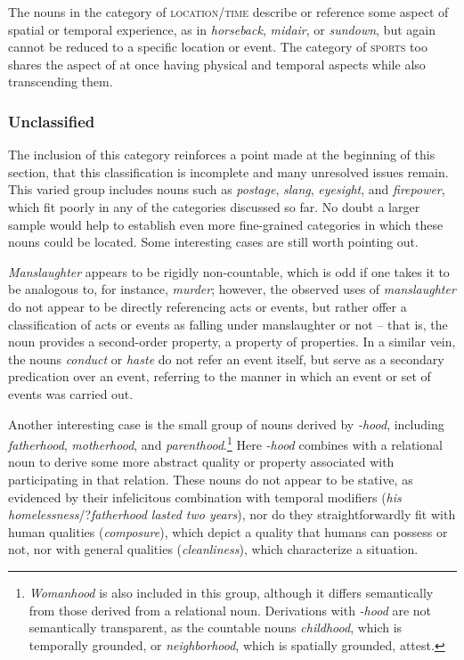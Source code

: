 \documentclass[output=paper]{langscibook}
\begin{document}
The nouns in the category of \textsc{location/time} describe or reference some aspect of spatial or temporal experience, as in \textit{horseback},  \textit{midair}, or \textit{sundown}, but again cannot be reduced to a specific location or event.  The category of \textsc{sports} too shares the aspect of at once having physical and temporal aspects while also transcending them.  


\subsubsection{Unclassified}  The inclusion of this category  reinforces a point made at the beginning of this section, that this classification is incomplete and many unresolved issues remain.  This varied group  includes nouns such as \textit{postage}, \textit{slang}, \textit{eyesight}, and \textit{firepower}, which fit poorly in any of the categories discussed so far.  No doubt a larger sample would help to establish even more fine-grained categories in which these nouns could be located.  Some interesting cases are still worth pointing out.  

\begin{sloppypar}
\textit{Manslaughter} appears to be rigidly non-countable, which is odd if one takes it to be analogous to, for instance, \textit{murder}; however, the observed uses of \textit{manslaughter} do not appear to be directly referencing acts or events, but rather offer a classification of acts or events as falling under manslaughter or not -- that is, the noun provides a second-order property, a property of properties. In a similar vein, the nouns \textit{conduct} or \textit{haste} do not refer an event itself, but serve as a secondary predication over an event, referring to the manner in which an event or set of events was carried out.
\end{sloppypar}


Another interesting case is the small group of nouns derived by \textit{-hood}, including \textit{fatherhood}, \textit{motherhood}, and \textit{parenthood}.\footnote{\textit{Womanhood} is also included in this group, although it differs semantically from those derived from a relational noun.  Derivations with \textit{-hood} are not semantically transparent, as the countable nouns \textit{childhood}, which is temporally grounded, or \textit{neighborhood}, which is spatially grounded, attest.}  Here \textit{-hood} combines with a relational noun to derive some more abstract quality or property associated with participating in that relation.  These nouns do not appear to be stative, as evidenced by their infelicitous combination with temporal modifiers (\textit{his homelessness}/?\textit{fatherhood lasted two years}), nor do they straightforwardly fit with human qualities (\textit{composure}), which depict a quality that humans can possess or not, nor with general qualities (\textit{cleanliness}), which characterize a situation. %
\end{document}

